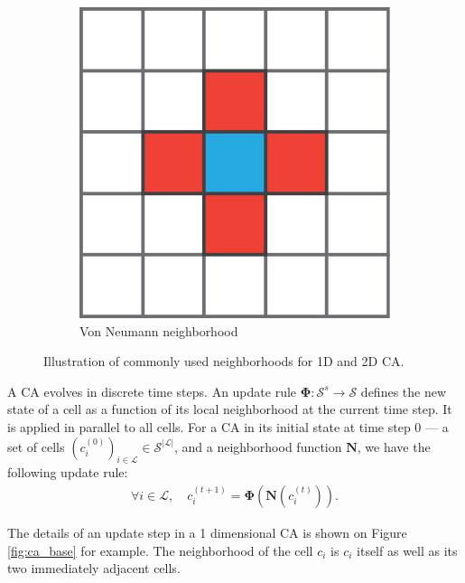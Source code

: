 \begin{figure}[htbp]
\begin{subfigure}[c]{.3\linewidth}
    \includegraphics[width=\linewidth]{figures/von_neumann}
    \caption{Von Neumann neighborhood}
    \label{fig:von_neumann}
  \end{subfigure}

  \caption{Illustration of commonly used neighborhoods for 1D and 2D \ac{CA}.}
  \label{fig:neighborhoods}
\end{figure}

A \ac{CA} evolves in discrete time steps. An update rule
$\boldsymbol{\Phi}: \mathcal{S}^{s} \rightarrow \mathcal{S}$ defines the new state of a cell as a
function of its local neighborhood at the current time step. It is applied in
parallel to all cells. For a \ac{CA} in its initial state at time
step 0 --- \ie a set of cells $\left(c_{i}^{(0)}\right)_{i \in \mathcal{L}} \in \mathcal{S}^{|\mathcal{L}|}$, and a
neighborhood function $\boldsymbol{N}$, we have the following update rule:
\begin{equation}
\begin{aligned}
\forall i \in \mathcal{L}, \quad c_{i}^{(t + 1)} = \boldsymbol{\Phi}\left(\boldsymbol{N}\left(c_{i}^{(t)}\right)\right).
\end{aligned}
\end{equation}

The details of an update step in a 1 dimensional \ac{CA} is shown on Figure
\ref{fig:ca_base} for example. The neighborhood of the cell $c_{i}$ is $c_{i}$
itself as well as its two immediately adjacent cells.

